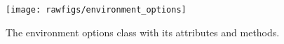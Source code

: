 \begin{figure}[htpb]
\centering
\texttt{[image: rawfigs/environment\_options]}
\vspace*{-1.2cm}
\caption{The environment options class with its attributes and methods.}
\label{fig-env-options-class}
\end{figure}



% 


